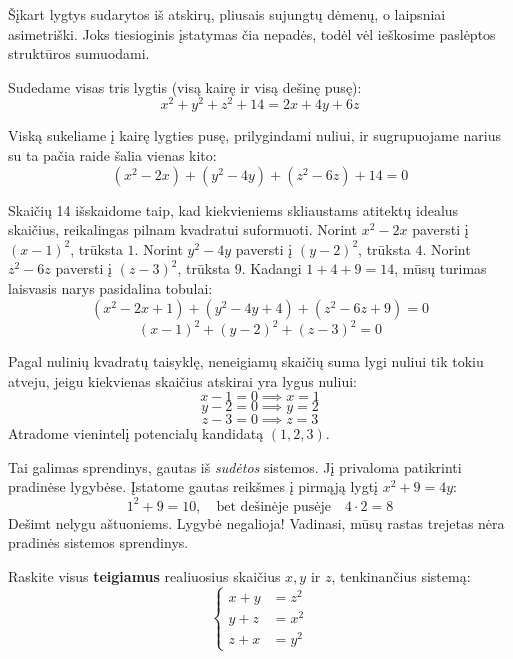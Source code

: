 \documentclass[11pt,a4paper]{scrartcl}
\begin{document}
\begin{solution}
Šįkart lygtys sudarytos iš atskirų, pliusais sujungtų dėmenų, o laipsniai asimetriški. Joks tiesioginis įstatymas čia nepadės, todėl vėl ieškosime paslėptos struktūros sumuodami.

Sudedame visas tris lygtis (visą kairę ir visą dešinę pusę):
$$ x^2+y^2+z^2+14 = 2x+4y+6z $$

Viską sukeliame į kairę lygties pusę, prilygindami nuliui, ir sugrupuojame narius su ta pačia raide šalia vienas kito:
$$ (x^2-2x) + (y^2-4y) + (z^2-6z) + 14 = 0 $$

Skaičių 14 išskaidome taip, kad kiekvieniems skliaustams atitektų idealus skaičius, reikalingas pilnam kvadratui suformuoti.
Norint $x^2-2x$ paversti į $(x-1)^2$, trūksta $1$.
Norint $y^2-4y$ paversti į $(y-2)^2$, trūksta $4$.
Norint $z^2-6z$ paversti į $(z-3)^2$, trūksta $9$.
Kadangi $1 + 4 + 9 = 14$, mūsų turimas laisvasis narys pasidalina tobulai:
$$ (x^2-2x+1) + (y^2-4y+4) + (z^2-6z+9) = 0 $$
$$ (x-1)^2 + (y-2)^2 + (z-3)^2 = 0 $$

Pagal nulinių kvadratų taisyklę, neneigiamų skaičių suma lygi nuliui tik tokiu atveju, jeigu kiekvienas skaičius atskirai yra lygus nuliui:
$$ x-1=0 \implies x=1 $$
$$ y-2=0 \implies y=2 $$
$$ z-3=0 \implies z=3 $$
Atradome vienintelį potencialų kandidatą $(1, 2, 3)$.

Tai galimas sprendinys, gautas iš \textit{sudėtos} sistemos. Jį privaloma patikrinti pradinėse lygybėse.
Įstatome gautas reikšmes į pirmąją lygtį $x^2+9=4y$:
$$ 1^2 + 9 = 10, \quad \text{bet dešinėje pusėje} \quad 4 \cdot 2 = 8 $$
Dešimt nelygu aštuoniems. Lygybė negalioja! Vadinasi, mūsų rastas trejetas nėra pradinės sistemos sprendinys.
\end{solution}


\begin{example}
Raskite visus \textbf{teigiamus} realiuosius skaičius $x, y$ ir $z$, tenkinančius sistemą:
\[
\left\{\begin{aligned}
    x + y &= z^2 \\
    y + z &= x^2 \\
    z + x &= y^2
\end{aligned}\right.
\]
\end{example}
\end{document}

